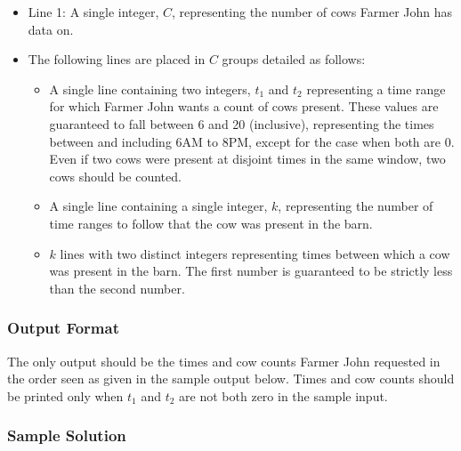 \begin{itemize}
    \item Line 1: A single integer, $C$, representing the number of cows Farmer John has data on.

    \item The following lines are placed in $C$ groups detailed as follows:
    \begin{itemize}
        \item A single line containing two integers, $t_1$ and $t_2$ representing a time range for which Farmer John wants a count of cows present.
        These values are guaranteed to fall between 6 and 20 (inclusive), representing the times between and including 6AM to 8PM, except for the case when both are 0.
        Even if two cows were present at disjoint times in the same window, two cows should be counted.

        \item A single line containing a single integer, $k$, representing the number of time ranges to follow that the cow was present in the barn.

        \item $k$ lines with two distinct integers representing times between which a cow was present in the barn.
        The first number is guaranteed to be strictly less than the second number.
    \end{itemize}
\end{itemize}


\subsubsection{Output Format}

The only output should be the times and cow counts Farmer John requested in the order seen as given in the sample output below.
Times and cow counts should be printed only when $t_1$ and $t_2$ are not both zero in the sample input.


\subsubsection{Sample Solution}

